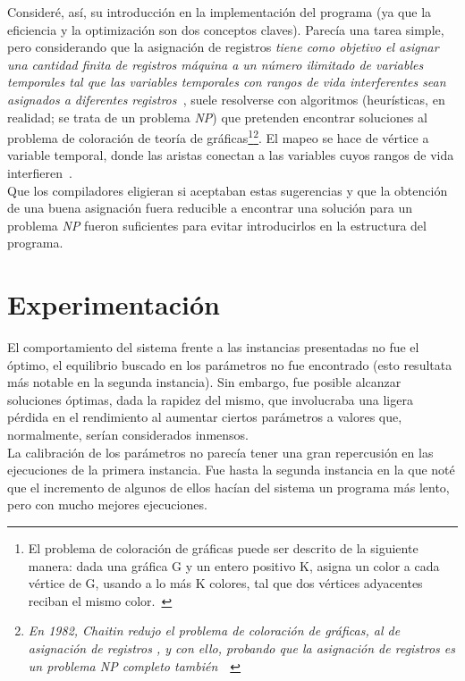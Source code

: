 \documentclass[a4paper]{report}
\begin{document}
Consider\'e, as\'i, su introducci\'on en la implementaci\'on del programa (ya que la eficiencia y la optimizaci\'on son
dos conceptos claves). Parec\'ia una tarea simple, pero considerando que la asignaci\'on
de registros \textit{tiene como objetivo el asignar una cantidad finita de registros m\'aquina a un n\'umero
  ilimitado de variables temporales tal que las variables temporales con rangos de vida interferentes sean
  asignados a diferentes registros~\cite{reg}}, suele resolverse con algoritmos (heur\'isticas, en realidad; se
trata de un problema \textit{NP}) que
pretenden encontrar soluciones al problema de coloraci\'on de teor\'ia de gr\'aficas\footnote{El problema de
  coloraci\'on de gr\'aficas puede ser descrito de la siguiente manera: dada una gr\'afica G y un entero positivo
  K, asigna un color a cada v\'ertice de G, usando a lo m\'as K colores, tal que dos v\'ertices adyacentes reciban
  el mismo color.~\cite{reg}}\footnote{\textit{En 1982, Chaitin redujo el problema de coloraci\'on de gr\'aficas, al de
    asignaci\'on de registros , y con ello, probando que la asignaci\'on de registros es un problema NP completo
    tambi\'en}~\cite{reg}~\cite{chaitin}}. El mapeo se hace de v\'ertice a variable temporal, donde las aristas
conectan a las variables cuyos rangos de vida interfieren~\cite{reg}.\\

Que los compiladores eligieran si aceptaban estas sugerencias y que la obtenci\'on de una buena asignaci\'on
fuera reducible a encontrar una soluci\'on para un problema \textit{NP} fueron suficientes para evitar
introducirlos en la estructura del programa.

\chapter{Experimentaci\'on}
El comportamiento del sistema frente a las instancias presentadas no fue el \'optimo, el equilibrio
buscado en los par\'ametros no fue encontrado (esto resultata m\'as notable en la segunda instancia).
Sin embargo, fue posible alcanzar soluciones \'optimas, dada la rapidez del mismo, que involucraba
una ligera p\'erdida en el rendimiento al aumentar ciertos par\'ametros a valores que, normalmente,
ser\'ian considerados inmensos.\\

La calibraci\'on de los par\'ametros no parec\'ia tener una gran repercusi\'on en
las ejecuciones de la primera instancia. Fue hasta la segunda instancia
en la que not\'e que el incremento de algunos de ellos hac\'ian del sistema un programa m\'as
lento, pero con mucho mejores ejecuciones.\\
\end{document}
